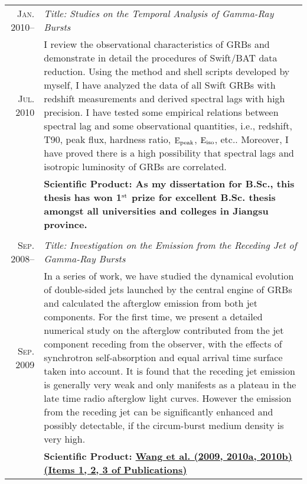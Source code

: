 \documentclass[10pt]{article}
\begin{document}
\begin{longtable}{r|p{17cm}}
\textsc{Jan. 2010}--     &   \emph{Title: Studies on the Temporal Analysis of Gamma-Ray Bursts}\\
\textsc{Jul. 2010}       &   \small{I review the observational characteristics of GRBs and demonstrate in detail the procedures of Swift/BAT data reduction. Using the method and shell scripts developed by myself, I have analyzed the data of all Swift GRBs with redshift measurements and derived spectral lags with high precision. I have tested some empirical relations between spectral lag and some observational quantities, i.e., redshift, T90, peak flux, hardness ratio, $\rm E_{peak}$, $\rm E_{iso}$, etc.. Moreover, I have proved there is a high possibility that spectral lags and isotropic luminosity of GRBs are correlated.} \\
                &   \textbf{Scientific Product: As my dissertation for B.Sc., this thesis has won 1$^{\rm st}$ prize for excellent B.Sc. thesis amongst all universities and colleges in Jiangsu province.} \\
\multicolumn{2}{c}{} \\

\textsc{Sep. 2008}--     &   \emph{Title: Investigation on the Emission from the Receding Jet of Gamma-Ray Bursts}   \\
\textsc{Sep. 2009}       &   \small{In a series of work, we have studied the dynamical evolution of double-sided jets launched by the central engine of GRBs and calculated the afterglow emission from both jet components. For the first time, we present a detailed numerical study on the afterglow contributed from the jet component receding from the observer, with the effects of synchrotron self-absorption and equal arrival time surface taken into account. It is found that the receding jet emission is generally very weak and only manifests as a plateau in the late time radio afterglow light curves. However the emission from the receding jet can be significantly enhanced and possibly detectable, if the circum-burst medium density is very high.} \\
                &   \textbf{Scientific Product: \hyperlink{1}{Wang et al. (2009, 2010a, 2010b) (Items 1, 2, 3 of Publications)}} \\

\end{longtable}


\vspace{-2ex}
\end{document}
